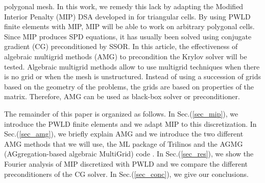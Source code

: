 polygonal mesh. In this work, we remedy this lack by adapting the Modified Interior 
Penalty (MIP) DSA developed in \cite{mip} for triangular cells. By using PWLD 
finite elements with MIP, MIP will be able to work on arbitrary polygonal 
cells. Since MIP produces SPD equations, it has usually 
been solved using conjugate gradient (CG) preconditioned by SSOR. In this
article, the effectiveness of algebraic multigrid methods (AMG) to precondition 
the Krylov solver \cite{amg,amg_course} will be tested. Algebraic multigrid methods 
allow to use multigrid techniques when there is no grid or when the mesh is 
unstructured. Instead of using a succession of grids based on the geometry of the 
problems, the grids are based on properties of the matrix. Therefore, AMG can
be used as black-box solver or preconditioner.

The remainder of this paper is organized as follows. In Sec.(\ref{sec_mip}),
we introduce the PWLD finite elements and we adapt MIP to this discretization. 
In Sec.(\ref{sec_amg}), we briefly explain AMG and we introduce the two different 
AMG methods that we will use, the ML package of Trilinos \cite{ml_guide} and the 
AGMG (AGgregation-based algebraic MultiGrid) code \cite{agmg_guide}. In 
Sec.(\ref{sec_res}), we show the Fourier analysis of MIP discretized with PWLD
and we compare the different preconditioners of the CG solver. In 
Sec.(\ref{sec_conc}), we give our conclusions.
